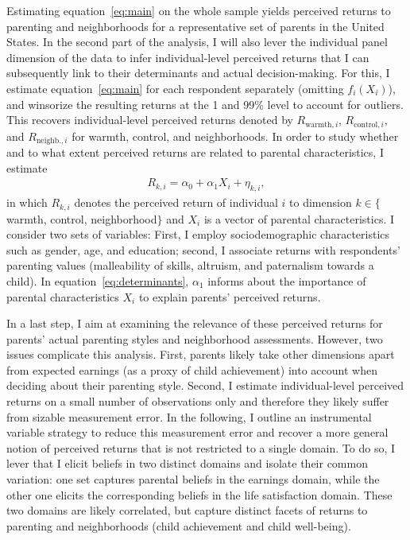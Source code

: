 \documentclass[12pt, a4paper, english]{article}
\begin{document}
Estimating equation~\eqref{eq:main} on the whole sample yields perceived returns to parenting and neighborhoods for a representative set of parents in the United States. In the second part of the analysis, I will also lever the individual panel dimension of the data to infer individual-level perceived returns that I can subsequently link to their determinants and actual decision-making. For this, I estimate equation~\eqref{eq:main} for each respondent separately (omitting $f_i(X_i)$), and winsorize the resulting returns at the 1 and 99\% level to account for outliers. This recovers individual-level perceived returns denoted by $R_{\text{warmth},i}$, $R_{\text{control},i}$, and $R_{\text{neighb.},i}$ for warmth, control, and neighborhoods. In order to study whether and to what extent perceived returns are related to parental characteristics, I estimate
\begin{align}
    R_{k,i} = \alpha_0 + \alpha_1 X_{i} + \eta_{k,i}, \label{eq:determinants}
\end{align}
in which $R_{k,i}$ denotes the perceived return of individual $i$ to dimension $k\in\{$warmth, control, neighborhood$\}$ and $X_i$ is a vector of parental characteristics. I consider two sets of variables: First, I employ sociodemographic characteristics such as gender, age, and education; second, I associate returns with respondents' parenting values (malleability of skills, altruism, and paternalism towards a child). In equation~\eqref{eq:determinants}, $\alpha_1$ informs about the importance of parental characteristics $X_{i}$ to explain parents' perceived returns.

In a last step, I aim at examining the relevance of these perceived returns for parents' actual parenting styles and neighborhood assessments. However, two issues complicate this analysis. First, parents likely take other dimensions apart from expected earnings (as a proxy of child achievement) into account when deciding about their parenting style. Second, I estimate individual-level perceived returns on a small number of observations only and therefore they likely suffer from sizable measurement error. In the following, I outline an instrumental variable strategy to reduce this measurement error and recover a more general notion of perceived returns that is not restricted to a single domain. To do so, I lever that I elicit beliefs in two distinct domains and isolate their common variation: one set captures parental beliefs in the earnings domain, while the other one elicits the corresponding beliefs in the life satisfaction domain. These two domains are likely correlated, but capture distinct facets of returns to parenting and neighborhoods (child achievement and child well-being). 
\end{document}
